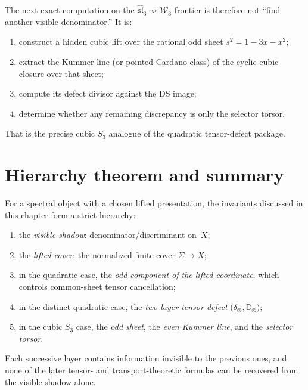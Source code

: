 \begin{remark}
\label{rem:what-next-computation-actually-is}
The next exact computation on the
$\widehat{\mathfrak{sl}}_3\rightsquigarrow\mathcal W_3$ frontier is therefore
not ``find another visible denominator.''  It is:
\begin{enumerate}[label=\textup{(\roman*)}]
\item construct a hidden cubic lift over the rational odd sheet
$s^2=1-3x-x^2$;
\item extract the Kummer line (or pointed Cardano class) of the cyclic cubic
closure over that sheet;
\item compute its defect divisor against the DS image;
\item determine whether any remaining discrepancy is only the selector torsor.
\end{enumerate}
That is the precise cubic $S_3$ analogue of the quadratic tensor-defect package.
\end{remark}

\section{Hierarchy theorem and summary}
\label{sec:hierarchy-summary}

\begin{theorem}
\label{thm:hierarchy-of-spectral-invariants}
For a spectral object with a chosen lifted presentation, the invariants discussed
in this chapter form a strict hierarchy:
\begin{enumerate}[label=\textup{(\roman*)}]
\item the \emph{visible shadow}: denominator/discriminant on~$X$;
\item the \emph{lifted cover}: the normalized finite cover $\Sigma\to X$;
\item in the quadratic case, the \emph{odd component of the lifted coordinate},
which controls common-sheet tensor cancellation;
\item in the distinct quadratic case, the \emph{two-layer tensor defect}
$\bigl(\delta_{\otimes},\mathbb D_{\otimes}\bigr)$;
\item in the cubic $S_3$ case, the \emph{odd sheet}, the \emph{even Kummer
line}, and the \emph{selector torsor}.
\end{enumerate}
Each successive layer contains information invisible to the previous ones, and
none of the later tensor- and transport-theoretic formulas can be recovered from
the visible shadow alone.
\end{theorem}

